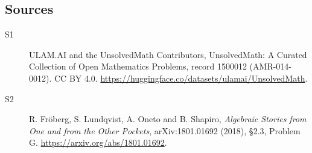 \documentclass[11pt]{article}
\begin{document}
\subsection{Sources}
\begin{description}
\item[\hypertarget{source:1500012:1}{S1}] ULAM.AI and the UnsolvedMath Contributors, UnsolvedMath: A Curated Collection of Open Mathematics Problems, record 1500012 (AMR-014-0012). CC BY 4.0. \url{https://huggingface.co/datasets/ulamai/UnsolvedMath}.
\item[\hypertarget{source:1500012:2}{S2}] R. Fröberg, S. Lundqvist, A. Oneto and B. Shapiro, \emph{Algebraic Stories from One and from the Other Pockets}, arXiv:1801.01692 (2018), §2.3, Problem G. \url{https://arxiv.org/abs/1801.01692}.
\end{description}
\label{end:1500012}
\end{document}
